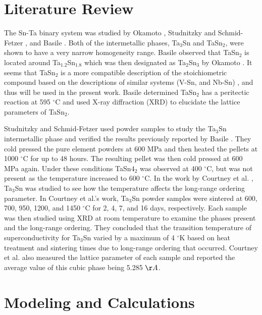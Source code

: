 \section{Literature Review}

The Sn-Ta binary system was studied by Okamoto \cite{Okamoto2003}, Studnitzky and Schmid-Fetzer \cite{Studnitzky2002}, and Basile \cite{Basile1971}.  Both of the intermetallic phases, Ta$_{3}$Sn and TaSn$_{2}$, were shown to have a very narrow homogeneity range. Basile \cite{Basile1971} observed that TaSn$_{2}$ is located around Ta$_{1.2}$Sn$_{1.8}$ which was then designated as Ta$_2$Sn$_3$ by Okamoto \cite{Okamoto2003}. It seems that TaSn$_2$ is a more compatible description of the stoichiometric compound based on the descriptions of similar systems (V-Sn, and Nb-Sn) \cite{Yue2009,Toffolon1998,Toffolon2002}, and thus will be used in the present work. Basile \cite{Basile1971} determined TaSn$_2$ has a peritectic reaction at 595 $^{\circ}$C and used X-ray diffraction (XRD) to elucidate the lattice parameters of TaSn$_2$.  

Studnitzky and Schmid-Fetzer \cite{Studnitzky2002} used powder samples to study the Ta$_3$Sn intermetallic phase and verified the results previously reported by Basile \cite{Basile1971}. They cold pressed the pure element powders at 600 MPa and then heated the pellets at 1000 $^{\circ}$C for up to 48 hours.  The resulting pellet was then cold pressed at 600 MPa again. Under these conditions TaSn$4_2$ was observed at 400 $^{\circ}$C, but was not present as the temperature increased to 600 $^{\circ}$C.  In the work by Courtney et al. \cite{Courtney1965}, Ta$_3$Sn was studied to see how the temperature affects the long-range ordering parameter. In Courtney et al.'s work, Ta$_3$Sn powder samples were sintered at 600, 700, 950, 1200, and 1450 $^{\circ}$C for 2, 4, 7, and 16 days, respectively.  Each sample was then studied using XRD at room temperature to examine the phases present and the long-range ordering. They concluded that the transition temperature of superconductivity for Ta$_3$Sn varied by a maximum of 4 $^{\circ}$K based on heat treatment and sintering times due to long-range ordering that occurred. Courtney et al. also measured the lattice parameter of each sample and reported the average value of this cubic phase being 5.285 $\AA$.


\section{Modeling and Calculations}

